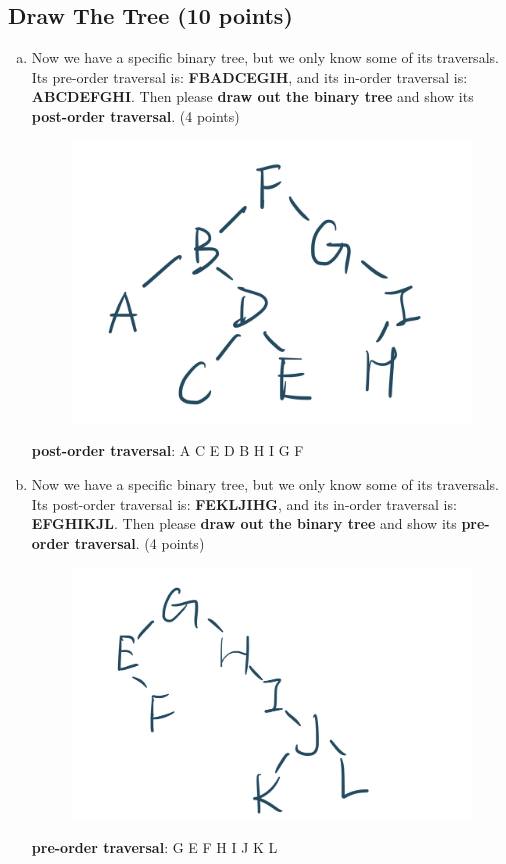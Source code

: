\documentclass[11pt]{exam}
\begin{document}
\subsection{Draw The Tree (10 points)}
\begin{enumerate}[a)]
\item Now we have a specific binary tree, but we only know some of its traversals. Its pre-order traversal is: \textbf{FBADCEGIH}, and its in-order traversal is: \textbf{ABCDEFGHI}. Then please \textbf{draw out the binary tree} and show its \textbf{post-order traversal}. (4 points)

\begin{solution}
\begin{figure}[H]
    \centering
    \includegraphics[width=.5\linewidth]{1.png}
\end{figure}
\textbf{post-order traversal}: A C E D B H I G F
\end{solution}
\item Now we have a specific binary tree, but we only know some of its traversals. Its post-order traversal is: \textbf{FEKLJIHG}, and its in-order traversal is: \textbf{EFGHIKJL}. Then please \textbf{draw out the binary tree} and show its \textbf{pre-order traversal}. (4 points)

\begin{solution}
\begin{figure}[H]
    \centering
    \includegraphics[width=.5\linewidth]{2.png}
\end{figure}
\textbf{pre-order traversal}: G E F H I J K L
\end{solution}


\end{enumerate}
\end{document}
